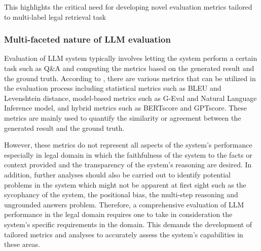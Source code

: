This highlights the critical need for developing novel evaluation metrics tailored to multi-label legal retrieval task

\subsubsection{Multi-faceted nature of LLM evaluation}

Evaluation of LLM system typically involves letting the system perform a certain task such as Q\&A and computing the metrics based on the generated result and the ground truth. According to \cite{llmeval}, there are various metrics that can be utilized in the evaluation process including statistical metrics such as BLEU\cite{papineni-etal-2002-bleu} and Levenshtein distance, model-based metrics such as G-Eval\cite{liu2023gevalnlgevaluationusing} and Natural Language Inference model, and hybrid metrics such as BERTscore\cite{zhang2020bertscoreevaluatingtextgeneration} and GPTscore\cite{fu2023gptscoreevaluatedesire}. These metrics are mainly used to quantify the similarity or agreement between the generated result and the ground truth. 

However, these metrics do not represent all aspects of the system's performance especially in legal domain in which the faithfulness of the system to the facts or context provided and the transparency of the system's reasoning are desired. In addition, further analyses should also be carried out to identify potential problems in the system which might not be apparent at first sight such as the sycophancy of the system, the positional bias, the multi-step reasoning and ungrounded answers problem. Therefore, a comprehensive evaluation of LLM performance in the legal domain requires one to take in consideration the system’s specific requirements in the domain. This demands the development of tailored metrics and analyses to accurately assess the system’s capabilities in these areas.


